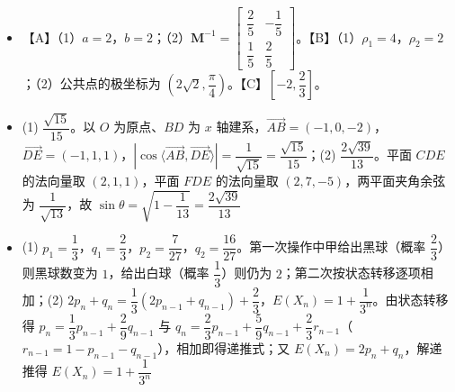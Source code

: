 \begin{itemize}[leftmargin=2.6em]
  \item[\textbf{21.}] 【A】（1）$a=2$，$b=2$；（2）$\boldsymbol M^{-1}=\begin{bmatrix}\dfrac25&-\dfrac15\\\dfrac15&\dfrac25\end{bmatrix}$。【B】（1）$\rho_1=4$，$\rho_2=2$；（2）公共点的极坐标为 $\left(2\sqrt2,\dfrac\pi4\right)$。【C】$\left[-2,\dfrac23\right]$。
\end{itemize}

\begin{itemize}[leftmargin=2.6em]
  \item[\textbf{22.}] (1) $\dfrac{\sqrt{15}}{15}$。以 $O$ 为原点、$BD$ 为 $x$ 轴建系，$\overrightarrow{AB}=(-1,0,-2)$，$\overrightarrow{DE}=(-1,1,1)$，$|\cos\langle\overrightarrow{AB},\overrightarrow{DE}\rangle|=\dfrac1{\sqrt{15}}=\dfrac{\sqrt{15}}{15}$；(2) $\dfrac{2\sqrt{39}}{13}$。平面 $CDE$ 的法向量取 $(2,1,1)$，平面 $FDE$ 的法向量取 $(2,7,-5)$，两平面夹角余弦为 $\dfrac1{\sqrt{13}}$，故 $\sin\theta=\sqrt{1-\dfrac1{13}}=\dfrac{2\sqrt{39}}{13}$
  \item[\textbf{23.}] (1) $p_1=\dfrac13$，$q_1=\dfrac23$，$p_2=\dfrac7{27}$，$q_2=\dfrac{16}{27}$。第一次操作中甲给出黑球（概率 $\dfrac23$）则黑球数变为 $1$，给出白球（概率 $\dfrac13$）则仍为 $2$；第二次按状态转移逐项相加；(2) $2p_n+q_n=\dfrac13\left(2p_{n-1}+q_{n-1}\right)+\dfrac23$，$E(X_n)=1+\dfrac1{3^n}$。由状态转移得 $p_n=\dfrac13p_{n-1}+\dfrac29q_{n-1}$ 与 $q_n=\dfrac23p_{n-1}+\dfrac59q_{n-1}+\dfrac23r_{n-1}$（$r_{n-1}=1-p_{n-1}-q_{n-1}$），相加即得递推式；又 $E(X_n)=2p_n+q_n$，解递推得 $E(X_n)=1+\dfrac1{3^n}$
\end{itemize}
